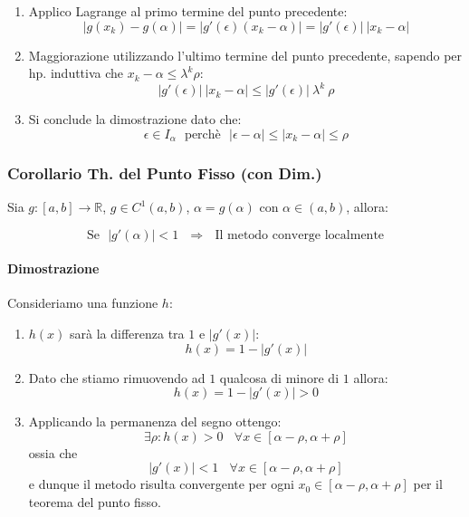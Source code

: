 \documentclass{article}
\begin{document}
\begin{enumerate}
\begin{enumerate}
\begin{enumerate}
            \item Applico Lagrange al primo termine del punto precedente:
            \[ |g(x_{k}) - g(\alpha)| = |g'(\epsilon) (x_{k} - \alpha)| = |g'(\epsilon)|\:|x_{k} - \alpha| \]
            \item Maggiorazione utilizzando l'ultimo termine del punto precedente, sapendo per hp. induttiva che $x_{k} - \alpha \leq \lambda^{k}\rho$:
            \[ |g'(\epsilon)|\:|x_{k} - \alpha| \leq |g'(\epsilon)|\:\lambda^{k}\:\rho \]
            \item Si conclude la dimostrazione dato che:
            \[ \epsilon \in I_{\alpha} \:\:\: \text{perchè} \:\:\: |\epsilon - \alpha| \leq |x_{k} - \alpha| \leq \rho \]
        \end{enumerate}
    \end{enumerate}
\end{enumerate}

\newpage

\subsubsection{Corollario Th. del Punto Fisso (con Dim.)}

Sia $g:[a,b] \rightarrow \mathbb{R}$, $g \in C^{1}(a,b)$, $\alpha = g(\alpha)$ con $\alpha \in (a,b)$, allora:

\[ \text{Se} \:\:\: |g'(\alpha)| < 1 \:\:\: \Rightarrow \:\:\: \text{Il metodo converge localmente}\]

\paragraph{Dimostrazione} Consideriamo una funzione $h$:

\begin{enumerate}
    \item $h(x)$ sarà la differenza tra $1$ e $|g'(x)|$:
    \[ h(x) = 1 - |g'(x)| \]
    \item Dato che stiamo rimuovendo ad $1$ qualcosa di minore di $1$ allora:
    \[ h(x) = 1 - |g'(x)| > 0 \]
    \item Applicando la permanenza del segno ottengo:
    \[ \exists \rho : h(x) > 0 \:\:\:\: \forall x \in [\alpha - \rho,\alpha + \rho] \]
    ossia che
    \[ |g'(x)| < 1 \:\:\:\: \forall x \in [\alpha - \rho,\alpha + \rho] \]
    e dunque il metodo risulta convergente per ogni $x_{0} \in [\alpha - \rho,\alpha + \rho]$ per il teorema del punto fisso.
\end{enumerate}
\end{document}
